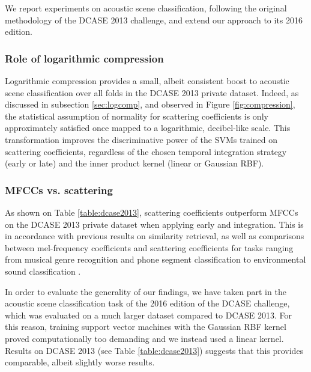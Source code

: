 \documentclass[journal]{IEEEtran}
\makeatletter
\newcommand*{\vs}{vs.\@\xspace}
\makeatother
\begin{document}
We report experiments on acoustic scene classification, following the original methodology of the DCASE 2013 challenge, and extend our approach to its 2016 edition.

\subsubsection*{Role of logarithmic compression}

Logarithmic compression provides a small, albeit consistent boost to acoustic scene classification over all folds in the DCASE 2013 private dataset.
Indeed, as discussed in subsection \ref{sec:logcomp}, and observed in Figure \ref{fig:compression}, the statistical assumption of normality for scattering coefficients is only approximately satisfied once mapped to a logarithmic, decibel-like scale. This transformation improves the discriminative power of the SVMs trained on scattering coefficients, regardless of the chosen temporal integration strategy (early or late) and the inner product kernel (linear or Gaussian RBF).

\subsubsection*{MFCCs \vs scattering}


As shown on Table \ref{table:dcase2013}, scattering coefficients outperform MFCCs on the DCASE 2013 private dataset when applying early and integration.
This is in accordance with previous results on similarity retrieval, as well as comparisons between mel-frequency coefficients and scattering coefficients for tasks ranging from musical genre recognition and phone segment classification \cite{Anden2014} to environmental sound classification \cite{Salamon2015}.

In order to evaluate the generality of our findings, we have taken part in the acoustic scene classification task of the 2016 edition of the DCASE challenge, which was evaluated on a much larger dataset compared to DCASE 2013. For this reason, training support vector machines with the Gaussian RBF kernel proved computationally too demanding and we instead used a linear kernel. Results on DCASE 2013 (see Table \ref{table:dcase2013}) suggests that this provides comparable, albeit slightly worse results.
\end{document}
